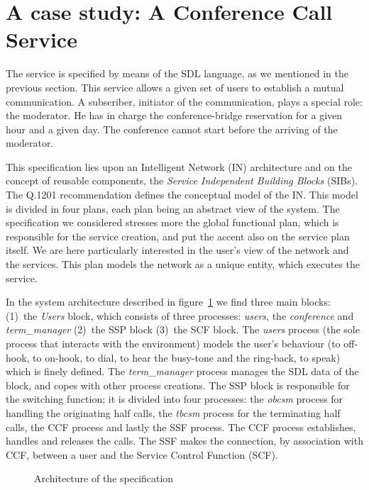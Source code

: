 \section{A case study: A Conference Call Service\label{descriptif_specification}}

The \audio service is specified by means of the SDL language, as we
mentioned in the previous section. This service allows a given set of
users to establish a mutual communication. A subscriber, initiator of
the communication, plays a special role: the moderator. He has in
charge the conference-bridge reservation for a given hour and a given
day. The conference cannot start before the arriving of the moderator.

This specification lies upon an Intelligent Network (IN) architecture
and on the concept of reusable components, the \emph{Service
Independent Building Blocks} (SIBs). The \mbox{Q.1201} recommendation
defines the conceptual model of the IN. This model is divided in four
plans, each plan being an abstract view of the system. The
specification we considered stresses more the global functional plan,
which is responsible for the service creation, and put the accent also
on the service plan itself. We are here particularly interested in the
user's view of the network and the services. This plan models the
network as a unique entity, which executes the service.

In the system architecture described in figure~\ref{archi} we find
three main blocks: (1)~the \emph{Users} block, which consists of
three processes: \emph{users}, the \emph{conference} and
\emph{term\_manager} (2)~the SSP block (3)~the SCF block. The
\emph{users} process (the sole process that interacts with the
environment) models the user's behaviour (to off-hook, to on-hook, to
dial, to hear the busy-tone and the ring-back, to speak) which is
finely defined. The \emph{term\_manager} process manages the SDL data
of the block, and copes with other process creations. The SSP block
is responsible for the switching function; it is divided into four
processes: the \emph{obcsm} process for handling the originating half
calls, the \emph{tbcsm} process for the terminating half calls, the
CCF process and lastly the SSF process. The CCF process establishes,
handles and releases the calls. The SSF makes the connection, by
association with CCF, between a user and the Service Control Function
(SCF).

\begin{figure}[htbp]
\begin{center}
\epsfxsize=8cm
\caption{Architecture of the specification}
\label{archi}
\end{center}
\end{figure}

